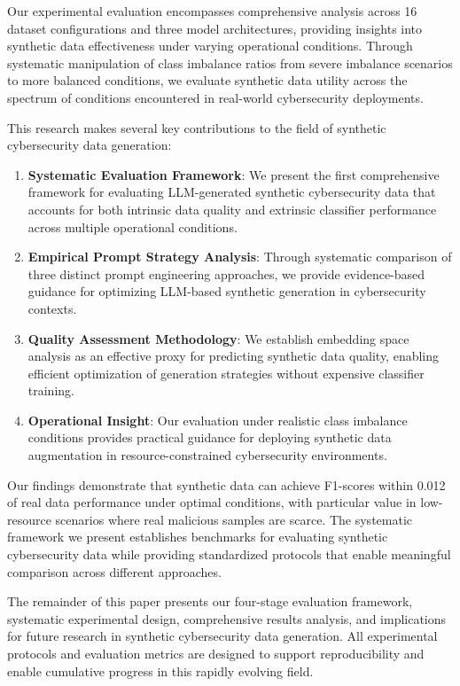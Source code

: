 Our experimental evaluation encompasses comprehensive analysis across 16 dataset configurations and three model architectures, providing insights into synthetic data effectiveness under varying operational conditions. Through systematic manipulation of class imbalance ratios from severe imbalance scenarios to more balanced conditions, we evaluate synthetic data utility across the spectrum of conditions encountered in real-world cybersecurity deployments.

This research makes several key contributions to the field of synthetic cybersecurity data generation:

\begin{enumerate}
\item \textbf{Systematic Evaluation Framework}: We present the first comprehensive framework for evaluating LLM-generated synthetic cybersecurity data that accounts for both intrinsic data quality and extrinsic classifier performance across multiple operational conditions.

\item \textbf{Empirical Prompt Strategy Analysis}: Through systematic comparison of three distinct prompt engineering approaches, we provide evidence-based guidance for optimizing LLM-based synthetic generation in cybersecurity contexts.

\item \textbf{Quality Assessment Methodology}: We establish embedding space analysis as an effective proxy for predicting synthetic data quality, enabling efficient optimization of generation strategies without expensive classifier training.

\item \textbf{Operational Insight}: Our evaluation under realistic class imbalance conditions provides practical guidance for deploying synthetic data augmentation in resource-constrained cybersecurity environments.
\end{enumerate}

Our findings demonstrate that synthetic data can achieve F1-scores within 0.012 of real data performance under optimal conditions, with particular value in low-resource scenarios where real malicious samples are scarce. The systematic framework we present establishes benchmarks for evaluating synthetic cybersecurity data while providing standardized protocols that enable meaningful comparison across different approaches.

The remainder of this paper presents our four-stage evaluation framework, systematic experimental design, comprehensive results analysis, and implications for future research in synthetic cybersecurity data generation. All experimental protocols and evaluation metrics are designed to support reproducibility and enable cumulative progress in this rapidly evolving field.